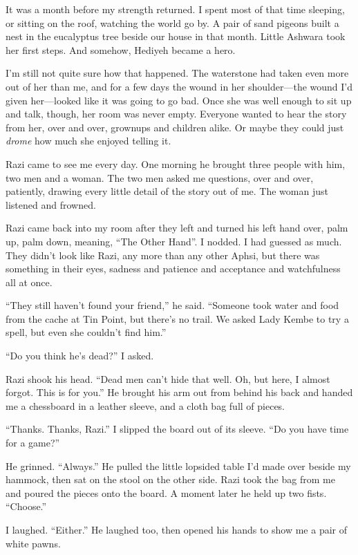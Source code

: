 It was a month before my strength returned.  I spent most of that time
sleeping, or sitting on the roof, watching the world go by.  A pair of
sand pigeons built a nest in the eucalyptus tree beside our house in
that month.  Little Ashwara took her first steps.  And somehow,
Hediyeh became a hero.

I'm still not quite sure how that happened.  The waterstone had taken
even more out of her than me, and for a few days the wound in her
shoulder---the wound I'd given her---looked like it was going to go
bad.  Once she was well enough to sit up and talk, though, her room
was never empty.  Everyone wanted to hear the story from her, over and
over, grownups and children alike.  Or maybe they could just \emph{drome}
how much she enjoyed telling it.

Razi came to see me every day.  One morning he brought three people
with him, two men and a woman.  The two men asked me questions, over
and over, patiently, drawing every little detail of the story out of
me.  The woman just listened and frowned.

Razi came back into my room after they left and turned his left hand
over, palm up, palm down, meaning, ``The Other Hand''.  I nodded.  I had
guessed as much.  They didn't look like Razi, any more than any other
Aphsi, but there was something in their eyes, sadness and patience and
acceptance and watchfulness all at once.

``They still haven't found your friend,'' he said.  ``Someone took water
and food from the cache at Tin Point, but there's no trail.  We asked
Lady Kembe to try a spell, but even she couldn't find him.''

``Do you think he's dead?''  I asked.

Razi shook his head.  ``Dead men can't hide that well.  Oh, but here, I
almost forgot.  This is for you.''  He brought his arm out from behind
his back and handed me a chessboard in a leather sleeve, and a cloth
bag full of pieces.

``Thanks.  Thanks, Razi.''  I slipped the board out of its sleeve.  ``Do
you have time for a game?''

He grinned.  ``Always.''  He pulled the little lopsided table I'd made
over beside my hammock, then sat on the stool on the other side.  Razi
took the bag from me and poured the pieces onto the board.  A moment
later he held up two fists.  ``Choose.''

I laughed.  ``Either.''  He laughed too, then opened his hands to show
me a pair of white pawns.



